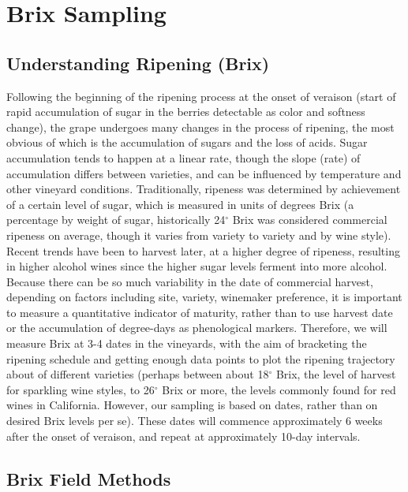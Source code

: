 \documentclass[11pt,letter]{article}
\begin{document}
\section{Brix Sampling}
\subsection{Understanding Ripening (Brix)}

Following the beginning of the ripening process at the onset of veraison (start of rapid accumulation of sugar in the berries detectable as color and softness change), the grape undergoes many changes in the process of ripening, the most obvious of which is the accumulation of sugars and the loss of acids. Sugar accumulation tends to happen at a linear rate, though the slope (rate) of accumulation differs between varieties, and can be influenced by temperature and other vineyard conditions. Traditionally, ripeness was determined by achievement of a certain level of sugar, which is measured in units of degrees Brix (a percentage by weight of sugar, historically 24$^{\circ}$ Brix was considered commercial ripeness on average, though it varies from variety to variety and by wine style). Recent trends have been to harvest later, at a higher degree of ripeness, resulting in higher alcohol wines since the higher sugar levels ferment into more alcohol. \\

Because there can be so much variability in the date of commercial harvest, depending on factors including site, variety, winemaker preference, it is important to measure a quantitative indicator of maturity, rather than to use harvest date or the accumulation of degree-days as phenological markers. Therefore, we will measure Brix at 3-4 dates in the vineyards, with the aim of bracketing the ripening schedule and getting enough data points to plot the ripening trajectory about of different varieties (perhaps between about 18$^{\circ}$ Brix, the level of harvest for sparkling wine styles, to  26$^{\circ}$ Brix or more, the levels commonly found for red wines in California. However, our sampling is based on dates, rather than on desired Brix levels per se). These dates will commence approximately 6 weeks after the onset of veraison, and repeat at approximately 10-day intervals. 

\subsection{Brix Field Methods}
\end{document}
